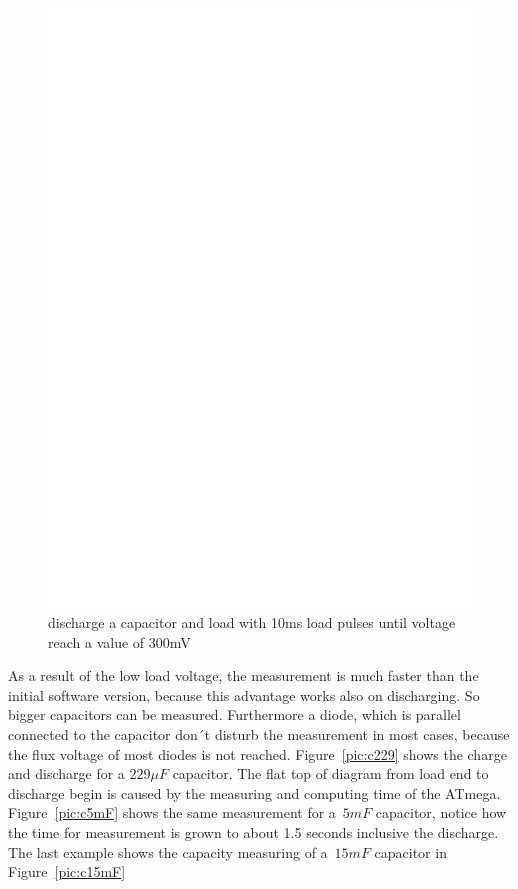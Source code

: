 \begin{figure}[H]
\centering
\includegraphics[]{../FIG/Bigcap.eps}
\caption{discharge a capacitor and load with 10ms load pulses until voltage reach a value of 300mV}
\label{fig:bigcap}
\end{figure}
As a result of the low load voltage, the measurement is much faster than the initial software version,
 because this advantage works also on discharging. So bigger capacitors can be measured.
Furthermore a diode, which is parallel connected to the capacitor don´t disturb the measurement in most cases,
because the flux voltage of most diodes is not reached.
Figure~\ref{pic:c229} shows the charge and discharge for a \(229\mu F\) capacitor.
The flat top of diagram from load end to discharge begin is caused by the measuring and computing time of the ATmega.
Figure~\ref{pic:c5mF} shows the same measurement for a~\(5mF\) capacitor,
notice how the time for measurement is grown to about 1.5 seconds inclusive the discharge. 
The last example shows the capacity measuring of a~\(15mF\) capacitor in Figure~\ref{pic:c15mF}

